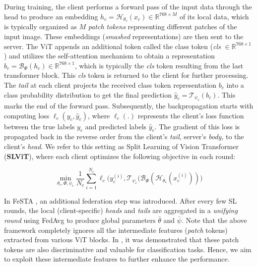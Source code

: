 \documentclass[runningheads]{llncs}
\begin{document}
During training, the client performs a forward pass of the input data through the head to produce an embedding $h_c = \mathbf{\mathcal{H}}_{\theta_c}(x_c) \in \mathbb{R}^{768\times M}$ of its local data, which is typically organized as $M$ \emph{patch tokens} representing different patches of the input image. These embeddings (\emph{smashed} representations) are then sent to the server. The ViT appends an additional token called the class token (\emph{cls} $\in \mathbb{R}^{768\times 1}$) and utilizes the self-attention mechanism to obtain a representation $b_c = \mathbf{\mathcal{B}}_\Phi(h_c) \in \mathbb{R}^{768\times 1}$, which is typically the \emph{cls} token resulting from the last transformer block. This \emph{cls} token is returned to the client for further processing. The \emph{tail} at each client projects the received class token representation $b_c$ into a class probability distribution to get the final prediction $\hat{y}_c = \mathbf{\mathcal{T}}_{\psi_c}(b_c)$. This marks the end of the forward pass. Subsequently, the backpropagation starts with computing loss $\ell_c(y_c,\hat{y}_c)$, where $\ell_c(.)$ represents the client's loss function between the true labels $y_c$ and predicted labels $\hat{y}_c$. The gradient of this loss is propagated back in the reverse order from the client's \emph{tail}, server's \emph{body}, to the client's \emph{head}. We refer to this setting as Split Learning of Vision Transformer (\textbf{SLViT}), where each client optimizes the following objective in each round: 

\begin{equation}
    \min_{\theta_c, \Phi, \psi_{c}} \frac{1}{N_c} \sum_{i=1}^{N_c} \ell_c \big(y_c^{(i)}, \mathbf{\mathcal{T}}_{\psi_c}(\mathbf{\mathcal{B}}_\Phi(\mathbf{\mathcal{H}}_{\theta_c}(x_c^{(i)}))\big)
    \label{eqn:vslobj}
\end{equation}

In FeSTA \cite{visonVits}, an additional federation step was introduced. After every few SL rounds, the local (client-specific) \emph{heads} and \emph{tails} are aggregated in a \emph{unifying round} using FedAvg \cite{mcmahan2017communication} to produce global parameters $\bar{\theta}$ and $\bar{\psi}$. Note that the above framework completely ignores all the intermediate features (\emph{patch} tokens) extracted from various ViT blocks. In \cite{farispaper}, it was demonstrated that these patch tokens are also discriminative and valuable for classification tasks. Hence, we aim to exploit these intermediate features to further enhance the performance. 
\end{document}
